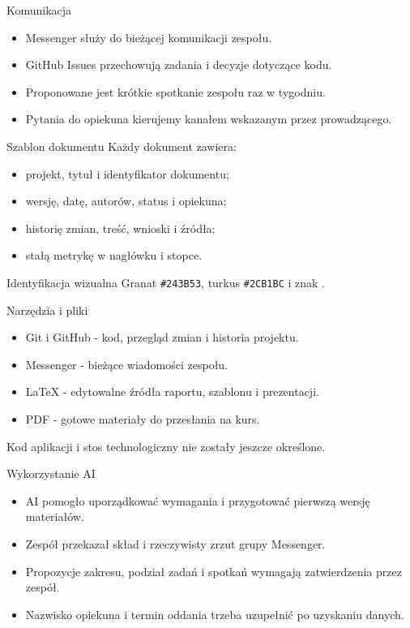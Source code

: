 \documentclass[aspectratio=169,11pt]{beamer}
\begin{document}
\begin{frame}{Komunikacja}
  \begin{itemize}
    \item Messenger służy do bieżącej komunikacji zespołu.
    \item GitHub Issues przechowują zadania i decyzje dotyczące kodu.
    \item Proponowane jest krótkie spotkanie zespołu raz w tygodniu.
    \item Pytania do opiekuna kierujemy kanałem wskazanym przez prowadzącego.
  \end{itemize}
\end{frame}

\begin{frame}{Szablon dokumentu}
  Każdy dokument zawiera:
  \begin{itemize}
    \item projekt, tytuł i identyfikator dokumentu;
    \item wersję, datę, autorów, status i opiekuna;
    \item historię zmian, treść, wnioski i źródła;
    \item stałą metrykę w nagłówku i stopce.
  \end{itemize}
  \vfill
  \begin{block}{Identyfikacja wizualna}
    Granat \texttt{\#243B53}, turkus \texttt{\#2CB1BC} i znak \RankItWordmark.
  \end{block}
\end{frame}

\begin{frame}{Narzędzia i pliki}
  \begin{itemize}
    \item Git i GitHub - kod, przegląd zmian i historia projektu.
    \item Messenger - bieżące wiadomości zespołu.
    \item LaTeX - edytowalne źródła raportu, szablonu i prezentacji.
    \item PDF - gotowe materiały do przesłania na kurs.
  \end{itemize}
  \vfill
  \small Kod aplikacji i stos technologiczny nie zostały jeszcze określone.
\end{frame}

\begin{frame}{Wykorzystanie AI}
  \begin{itemize}
    \item AI pomogło uporządkować wymagania i przygotować pierwszą wersję materiałów.
    \item Zespół przekazał skład i rzeczywisty zrzut grupy Messenger.
    \item Propozycje zakresu, podział zadań i spotkań wymagają zatwierdzenia przez zespół.
    \item Nazwisko opiekuna i termin oddania trzeba uzupełnić po uzyskaniu danych.
  \end{itemize}
\end{frame}
\end{document}
